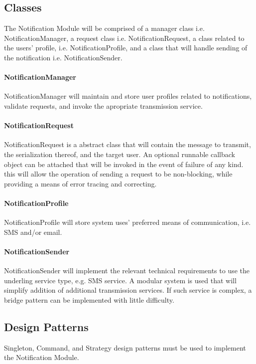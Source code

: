\subsection{Classes}
The Notification Module will be comprised of a manager class i.e. NotificationManager, a request class i.e. NotificationRequest, a class related to the users' profile, i.e. NotificationProfile, and a class that will handle sending of the notification i.e. NotificationSender.

\paragraph{NotificationManager}
NotificationManager will maintain and store user profiles related to notifications, validate requests, and invoke the apropriate transmission service.

\paragraph{NotificationRequest}
NotificationRequest is a abstract class that will contain the message to transmit, the serialization thereof, and the target user. An optional runnable callback object can be attached that will be invoked in the event of failure of any kind. this will allow the operation of sending a request to be non-blocking, while providing a means of error tracing and correcting.

\paragraph{NotificationProfile}
NotificationProfile will store system uses' preferred means of communication, i.e. SMS and/or email.

\paragraph{NotificationSender}
NotificationSender will implement the relevant technical requirements to use the underling service type, e.g. SMS service. A modular system is used that will simplify addition of additional transmission services. If such service is complex, a bridge pattern can be implemented with little difficulty.

\subsection{Design Patterns}
Singleton, Command, and Strategy design patterns must be used to implement the Notification Module.


